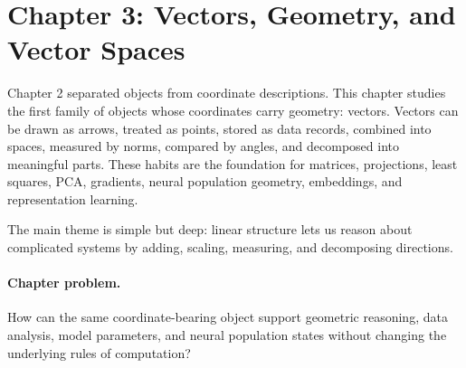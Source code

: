 \section{Chapter 3: Vectors, Geometry, and Vector Spaces}
\label{ch:vectors-geometry-vector-spaces}

Chapter 2 separated objects from coordinate descriptions. This chapter studies the first family of objects whose coordinates carry geometry: vectors. Vectors can be drawn as arrows, treated as points, stored as data records, combined into spaces, measured by norms, compared by angles, and decomposed into meaningful parts. These habits are the foundation for matrices, projections, least squares, PCA, gradients, neural population geometry, embeddings, and representation learning.

The main theme is simple but deep: linear structure lets us reason about complicated systems by adding, scaling, measuring, and decomposing directions.

\paragraph{Chapter problem.}
How can the same coordinate-bearing object support geometric reasoning, data analysis, model parameters, and neural population states without changing the underlying rules of computation?

